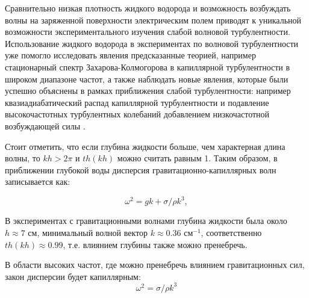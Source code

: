 Сравнительно низкая плотность жидкого водорода и возможность возбуждать волны на заряженной поверхности электрическим полем приводят к уникальной возможности экспериментального изучения слабой волновой турбулентности. Использование жидкого водорода в экспериментах по волновой турбулентности уже помогло исследовать явления предсказанные теорией, например стационарный  спектр Захарова-Колмогорова в капиллярной турбулентности в широком диапазоне частот, а также наблюдать новые явления, которые были успешно объяснены в рамках  приближения слабой турбулентности: например квазиадиабатический распад капиллярной турбулентности \cite{quasiadiabatic} и подавление высокочастотных турбулентных колебаний добавлением низкочастотной возбуждающей силы \cite{addLowFreq}.

Стоит отметить, что если глубина жидкости больше, чем характерная длина волны, то $kh > 2\pi$ и $th(kh)$ можно считать равным 1. Таким образом, в приближении глубокой воды дисперсия гравитационно-капиллярных волн записывается как:


\begin{equation}
 \label{eq:disper}
\omega^2 = gk + \sigma/\rho k^3,
\end{equation}


В экспериментах с гравитационными волнами глубина жидкости была около $ h \approx 7$ см, минимальный волной вектор $k \approx 0.36$ см$^{-1}$, соответственно $th(kh) \approx 0.99$, т.е. влиянием глубины также можно пренебречь.


В области высоких частот, где можно пренебречь влиянием гравитационных сил, закон дисперсии будет капиллярным:
\begin{equation}
 \label{eq:disperCap}
\omega^2 = \sigma/\rho k^3
\end{equation}


